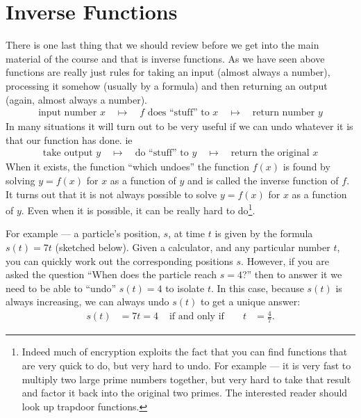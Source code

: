 \section{Inverse Functions}\label{sec inverse functions}
There is one last thing that we should review before we get into the main material of the
course and that is inverse functions. As we have seen above functions are really just
rules for taking an input (almost always a number), processing it somehow (usually by a
formula) and then returning an output (again, almost always a number).
\begin{align*}
 \text{input number $x$} \quad \mapsto \quad \text{$f$ does ``stuff'' to $x$} \quad
\mapsto \quad \text{return number $y$}
\end{align*}
In many situations it will turn out to be very useful if we can undo whatever it is that
our function has done. ie
\begin{align*}
 \text{take output $y$} \quad \mapsto \quad \text{do ``stuff'' to $y$}
  \quad \mapsto \quad \text{return the original $x$}
\end{align*}
When it exists, the function ``which undoes'' the function $f(x)$ is found by solving
$y=f(x)$ for $x$ as a function of $y$ and is called the inverse function of $f$.
It turns out that it is not always possible to solve $y=f(x)$ for $x$ as a
function of $y$. Even when it is possible, it can be really hard to
do\footnote{Indeed much of encryption exploits the fact that you can find
functions that are very quick to do, but very hard to undo. For example --- it
is very fast to multiply two large prime numbers together, but very hard to take
that result and factor it back into the original two primes. The interested
reader should look up trapdoor functions.}.


For example --- a particle's position, $s$, at time $t$ is given by the formula
$s(t) = 7t$ (sketched below). Given a calculator, and any particular number $t$,
you can quickly work out the corresponding positions $s$. However, if you are
asked the question ``When does the particle reach $s=4$?'' then to answer it we
need to be able to ``undo'' $s(t)=4$ to isolate $t$. In this case, because
$s(t)$ is always increasing, we can always undo $s(t)$ to get a unique answer:
\begin{align*}
  s(t) &= 7t = 4 & \text{ if and only if }&& t&= \frac{4}{7}.
\end{align*}

